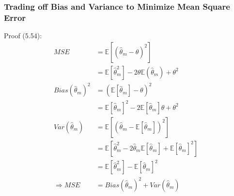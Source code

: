 \documentclass[12pt]{article}
\numberwithin{equation}{section}
\begin{document}
\subsubsection{Trading off Bias and Variance to Minimize Mean Square Error}
Proof (5.54):
\begin{equation}\begin{split}
	MSE&=\mathbb{E}[(\hat{\theta}_m-\theta)^2] \\
	&=\mathbb{E}[\hat{\theta}_m^2]-2\theta\mathbb{E}(\hat{\theta}_m)+\theta^2 \\
	Bias(\hat{\theta}_m)^2
	&=(\mathbb{E}[\hat{\theta}_m]-\theta)^2 \\
	&=\mathbb{E}[\hat{\theta}_m]^2-2\mathbb{E}[\hat{\theta}_m]\theta+\theta^2 \\
	Var(\hat{\theta}_m)
	&=\mathbb{E}[(\hat{\theta}_m-\mathbb{E}[\hat{\theta}_m])^2]\\
	&=\mathbb{E}[\hat{\theta}_m^2-2\hat{\theta}_m\mathbb{E}[\hat{\theta}_m]+\mathbb{E}[\hat{\theta}_m]^2]\\
	&=\mathbb{E}[\hat{\theta}_m^2]-\mathbb{E}[\hat{\theta}_m]^2\\
	\Rightarrow
	MSE&=Bias(\hat{\theta}_m)^2+Var(\hat{\theta}_m)
\end{split}\end{equation}
\end{document}
